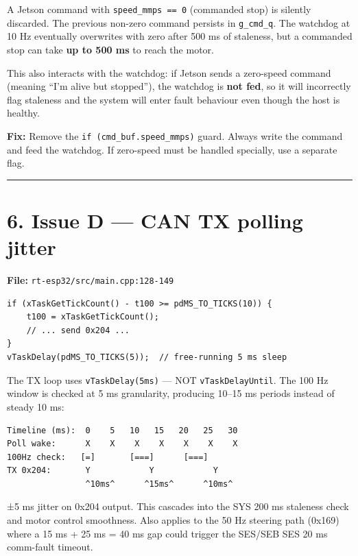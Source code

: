 \documentclass[12pt,a4paper,oneside]{report}
\begin{document}
A Jetson command with \texttt{speed\_mmps\ ==\ 0} (commanded stop) is silently
discarded. The previous non-zero command persists in \texttt{g\_cmd\_q}. The
watchdog at 10 Hz eventually overwrites with zero after 500 ms of staleness, but
a commanded stop can take \textbf{up to 500 ms} to reach the motor.

This also interacts with the watchdog: if Jetson sends a zero-speed command
(meaning ``I'm alive but stopped''), the watchdog is \textbf{not fed}, so it
will incorrectly flag staleness and the system will enter fault behaviour even
though the host is healthy.

\textbf{Fix:} Remove the \texttt{if\ (cmd\_buf.speed\_mmps)} guard. Always write
the command and feed the watchdog. If zero-speed must be handled specially, use
a separate flag.

\begin{center}\rule{0.5\linewidth}{0.5pt}\end{center}

\section{6. Issue D --- CAN TX polling
jitter}\label{issue-d-can-tx-polling-jitter}

\textbf{File:} \texttt{rt-esp32/src/main.cpp:128-149}

\begin{verbatim}
if (xTaskGetTickCount() - t100 >= pdMS_TO_TICKS(10)) {
    t100 = xTaskGetTickCount();
    // ... send 0x204 ...
}
vTaskDelay(pdMS_TO_TICKS(5));  // free-running 5 ms sleep
\end{verbatim}

The TX loop uses \texttt{vTaskDelay(5ms)} --- NOT \texttt{vTaskDelayUntil}. The
100 Hz window is checked at 5 ms granularity, producing 10--15 ms periods
instead of steady 10 ms:

\begin{verbatim}
Timeline (ms):  0    5   10   15   20   25   30
Poll wake:      X    X    X    X    X    X    X
100Hz check:   [=]       [===]      [===]
TX 0x204:       Y            Y            Y
                ^10ms^      ^15ms^      ^10ms^
\end{verbatim}

±5 ms jitter on 0x204 output. This cascades into the SYS 200 ms staleness check
and motor control smoothness. Also applies to the 50 Hz steering path (0x169)
where a 15 ms + 25 ms = 40 ms gap could trigger the SES/SEB SES 20 ms
comm-fault timeout.
\end{document}
